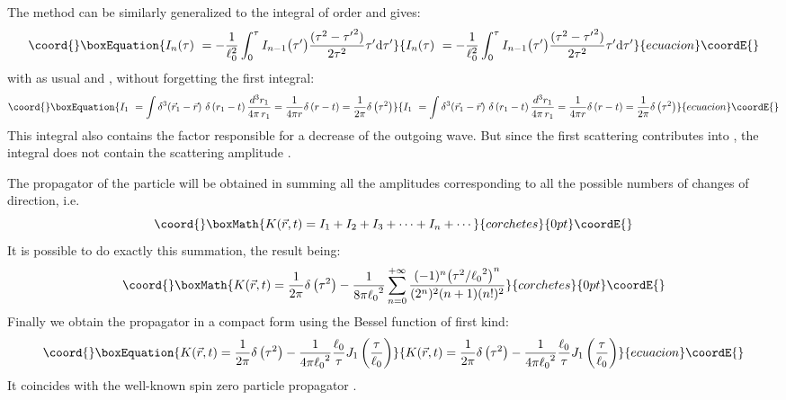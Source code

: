 \documentclass[a4paper,12pt]{article}
\providecommand{\dd}{\text{d}}%
\begin{document}
The method can be similarly generalized to the integral of order
\coordHE{} and gives:
\begin{equation}\coord{}\boxEquation{\label{rw5}
I_{n}(\tau)\ = -\dfrac{1}{\ell_{0}^{2}} \int_{0}^{\tau}
I_{n-1}\bigl({{\tau^{\prime}}}\bigr)\dfrac{(\tau
^{2}-{\tau^{\prime}}^{2})}{2 \tau^{2}}\tau^{\prime}\dd {\tau^{\prime}}
}{I_{n}(\tau)\ = -\dfrac{1}{\ell_{0}^{2}} \int_{0}^{\tau}
I_{n-1}\bigl({{\tau^{\prime}}}\bigr)\dfrac{(\tau
^{2}-{\tau^{\prime}}^{2})}{2 \tau^{2}}\tau^{\prime}\dd {\tau^{\prime}}
}{ecuacion}\coordE{}\end{equation}
with as usual   \coordHE{}    and \coordHE{},
without forgetting the first integral:
\begin{equation}\coord{}\boxEquation{\label{rw5a}
I_{1}\ = \int \delta^{3}\!\left({\vec{r}_{1} -
\vec r}\right)\,\delta \left(r_{1}-t\right)
\frac{d^{3}r_{1}}{4\pi\,r_{1}} =
\frac{1}{4\pi r}
\delta\left(r-t\right)=\frac{1}{2\pi}\delta\left(\tau^2\right)
}{I_{1}\ = \int \delta^{3}\!\left({\vec{r}_{1} -
\vec r}\right)\,\delta \left(r_{1}-t\right)
\frac{d^{3}r_{1}}{4\pi\,r_{1}} =
\frac{1}{4\pi r}
\delta\left(r-t\right)=\frac{1}{2\pi}\delta\left(\tau^2\right)
}{ecuacion}\coordE{}\end{equation}
This integral also contains the factor  \coordHE{}
responsible for a decrease of the outgoing wave. But since the
first scattering contributes into \coordHE{}, the integral \coordHE{}
does not contain the scattering amplitude \coordHE{}.


The propagator of the particle will be obtained in summing all the
amplitudes corresponding to all the possible numbers of changes of
direction, i.e.
\[\coord{}\boxMath{
K(\vec r,t) = I_{1}+I_{2}+I_{3}+\cdots+I_{n}+\cdots
}{corchetes}{0pt}\coordE{}\]
It is possible to do exactly this summation, the result being:
\[\coord{}\boxMath{
K(\vec r,t) = \frac{1}{2\pi}\delta\left(\tau^2\right)
-\dfrac{1}{8\pi{\ell_{0}}^{2}}
\sum_{n=0}^{+\infty}\dfrac{(-1)^n{\left (\tau^{2}/{\ell_{0}}^{2}\right)}^{n}}
{(2^{n})^{2}(n+1)(n!)^{2}}
}{corchetes}{0pt}\coordE{}\]
Finally we obtain the propagator in a compact form using \coordHE{} the Bessel
function of first kind:
\begin{equation}\coord{}\boxEquation{\label{rw5c}
K(\vec r,t) = \frac{1}{2\pi}\delta\left(\tau^2\right)-
\frac{1}{4\pi{\ell_{0}}^{2}}
\frac{\ell_{0}}{\tau}
J_{1}\left(\frac{\tau}{\ell_{0}}\right)
}{K(\vec r,t) = \frac{1}{2\pi}\delta\left(\tau^2\right)-
\frac{1}{4\pi{\ell_{0}}^{2}}
\frac{\ell_{0}}{\tau}
J_{1}\left(\frac{\tau}{\ell_{0}}\right)
}{ecuacion}\coordE{}\end{equation}
It coincides with the well-known spin zero particle propagator \cite{bogol}.
\end{document}
